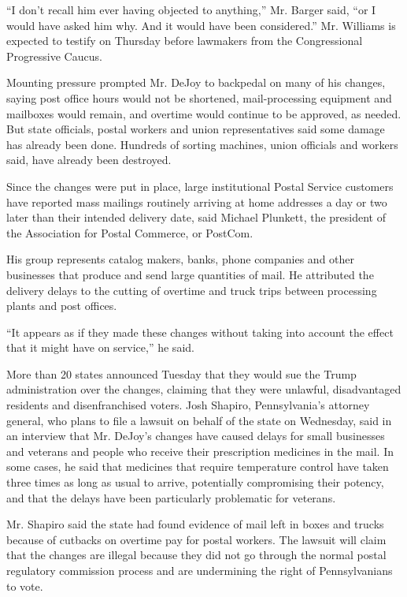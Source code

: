 ``I don't recall him ever having objected to anything,'' Mr. Barger
said, ``or I would have asked him why. And it would have been
considered.'' Mr. Williams is expected to testify on Thursday before
lawmakers from the Congressional Progressive Caucus.

Mounting pressure prompted Mr. DeJoy to backpedal on many of his
changes, saying post office hours would not be shortened,
mail-processing equipment and mailboxes would remain, and overtime would
continue to be approved, as needed. But state officials, postal workers
and union representatives said some damage has already been done.
Hundreds of sorting machines, union officials and workers said, have
already been destroyed.

Since the changes were put in place, large institutional Postal Service
customers have reported mass mailings routinely arriving at home
addresses a day or two later than their intended delivery date, said
Michael Plunkett, the president of the Association for Postal Commerce,
or PostCom.

His group represents catalog makers, banks, phone companies and other
businesses that produce and send large quantities of mail. He attributed
the delivery delays to the cutting of overtime and truck trips between
processing plants and post offices.

``It appears as if they made these changes without taking into account
the effect that it might have on service,'' he said.

More than 20 states announced Tuesday that they would sue the Trump
administration over the changes, claiming that they were unlawful,
disadvantaged residents and disenfranchised voters. Josh Shapiro,
Pennsylvania's attorney general, who plans to file a lawsuit on behalf
of the state on Wednesday, said in an interview that Mr. DeJoy's changes
have caused delays for small businesses and veterans and people who
receive their prescription medicines in the mail. In some cases, he said
that medicines that require temperature control have taken three times
as long as usual to arrive, potentially compromising their potency, and
that the delays have been particularly problematic for veterans.

Mr. Shapiro said the state had found evidence of mail left in boxes and
trucks because of cutbacks on overtime pay for postal workers. The
lawsuit will claim that the changes are illegal because they did not go
through the normal postal regulatory commission process and are
undermining the right of Pennsylvanians to vote.

